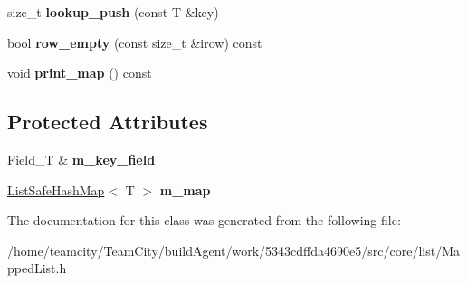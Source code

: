 \begin{DoxyCompactItemize}
\item 
size\+\_\+t {\bfseries lookup\+\_\+push} (const T \&key)\hypertarget{classMappedList_ac48383eb9b61a4ff5666b8c1563afd10}{}\label{classMappedList_ac48383eb9b61a4ff5666b8c1563afd10}

\item 
bool {\bfseries row\+\_\+empty} (const size\+\_\+t \&irow) const \hypertarget{classMappedList_a773ada4e3e7b0e8a911ca6d2cdb3df01}{}\label{classMappedList_a773ada4e3e7b0e8a911ca6d2cdb3df01}

\item 
void {\bfseries print\+\_\+map} () const \hypertarget{classMappedList_ac758852dea11206bbf7ca07e2b1d3278}{}\label{classMappedList_ac758852dea11206bbf7ca07e2b1d3278}

\end{DoxyCompactItemize}
\subsection*{Protected Attributes}
\begin{DoxyCompactItemize}
\item 
Field\+\_\+T \& {\bfseries m\+\_\+key\+\_\+field}\hypertarget{classMappedList_a3a0930ba978562dc442f5dfca581d162}{}\label{classMappedList_a3a0930ba978562dc442f5dfca581d162}

\item 
\hyperlink{structListSafeHashMap}{List\+Safe\+Hash\+Map}$<$ T $>$ {\bfseries m\+\_\+map}\hypertarget{classMappedList_ac3a5b493e331554f3cb950fd2e0953be}{}\label{classMappedList_ac3a5b493e331554f3cb950fd2e0953be}

\end{DoxyCompactItemize}


The documentation for this class was generated from the following file\+:\begin{DoxyCompactItemize}
\item 
/home/teamcity/\+Team\+City/build\+Agent/work/5343cdffda4690e5/src/core/list/Mapped\+List.\+h\end{DoxyCompactItemize}

